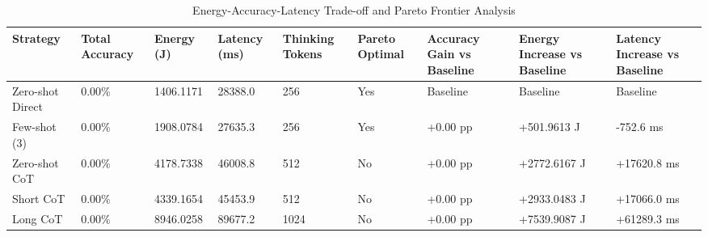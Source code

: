 \begin{table}
\caption{Energy-Accuracy-Latency Trade-off and Pareto Frontier Analysis}
\label{tab:tradeoff_comparison}
\begin{tabular}{lllllllll}
\toprule
Strategy & Total Accuracy & Energy (J) & Latency (ms) & Thinking Tokens & Pareto Optimal & Accuracy Gain vs Baseline & Energy Increase vs Baseline & Latency Increase vs Baseline \\
\midrule
Zero-shot Direct & 0.00\% & 1406.1171 & 28388.0 & 256 & Yes & Baseline & Baseline & Baseline \\
Few-shot (3) & 0.00\% & 1908.0784 & 27635.3 & 256 & Yes & +0.00 pp & +501.9613 J & -752.6 ms \\
Zero-shot CoT & 0.00\% & 4178.7338 & 46008.8 & 512 & No & +0.00 pp & +2772.6167 J & +17620.8 ms \\
Short CoT & 0.00\% & 4339.1654 & 45453.9 & 512 & No & +0.00 pp & +2933.0483 J & +17066.0 ms \\
Long CoT & 0.00\% & 8946.0258 & 89677.2 & 1024 & No & +0.00 pp & +7539.9087 J & +61289.3 ms \\
\bottomrule
\end{tabular}
\end{table}
